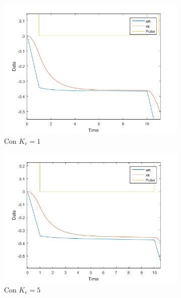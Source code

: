 \documentclass[a4paper, fontsize=11pt]{scrartcl} %
\numberwithin{equation}{section} %
\numberwithin{figure}{section} %
\numberwithin{table}{section} %
\begin{document}
	\begin{figure}[h!]
		\centering
		\begin{subfigure}[t]{.5\textwidth}
			\centering
			\includegraphics[width=1\linewidth]{images/Ke1.PNG}
			\caption{Con $K_e = 1$}
			\label{Ke1}
		\end{subfigure}%
		\begin{subfigure}[t]{.5\textwidth}
			\centering
			\includegraphics[width=1\linewidth]{images/Ke5.PNG}
			\caption{Con $K_e = 5$}
			\label{Ke5}
		\end{subfigure}
		\begin{subfigure}[t]{.5\textwidth}
			\centering

\end{subfigure}
\end{figure}
\end{document}
